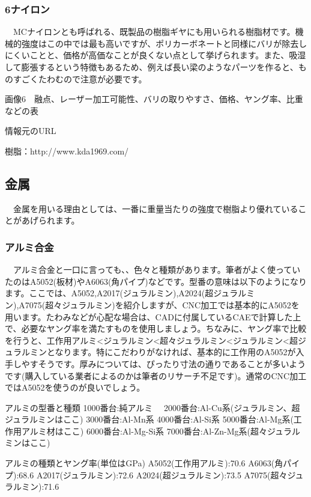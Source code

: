 \documentclass[onecolumn]{preport}
\begin{document}
\subsubsection{6ナイロン}

　MCナイロンとも呼ばれる、既製品の樹脂ギヤにも用いられる樹脂材です。機械的強度はこの中では最も高いですが、ポリカーボネートと同様にバリが除去しにくいことと、価格が高価なことが良くない点として挙げられます。また、吸湿して膨張するという特徴もあるため、例えば長い梁のようなパーツを作ると、ものすごくたわむので注意が必要です。

画像6　融点、レーザー加工可能性、バリの取りやすさ、価格、ヤング率、比重などの表

情報元のURL

樹脂：http://www.kda1969.com/

\subsection{金属}

　金属を用いる理由としては、一番に重量当たりの強度で樹脂より優れていることがあげられます。

\subsubsection{アルミ合金}

　アルミ合金と一口に言っても、、色々と種類があります。筆者がよく使っていたのはA5052(板材)やA6063(角パイプ)などです。型番の意味は以下のようになります。ここでは、A5052,A2017(ジュラルミン),A2024(超ジュラルミン),A7075(超々ジュラルミン)を紹介しますが、CNC加工では基本的にA5052を用います。たわみなどが心配な場合は、CADに付属しているCAEで計算した上で、必要なヤング率を満たすものを使用しましょう。ちなみに、ヤング率で比較を行うと、工作用アルミ<ジュラルミン<超々ジュラルミン<ジュラルミン<超ジュラルミンとなります。特にこだわりがなければ、基本的に工作用のA5052が入手しやすそうです。厚みについては、ぴったり寸法の通りであることが多いようです(購入している業者によるのかは筆者のリサーチ不足です)。通常のCNC加工ではA5052を使うのが良いでしょう。

アルミの型番と種類
1000番台:純アルミ　
2000番台:Al-Cu系(ジュラルミン、超ジュラルミンはここ)
3000番台:Al-Mn系
4000番台:Al-Si系
5000番台:Al-Mg系(工作用アルミ材はここ)
6000番台:Al-Mg-Si系
7000番台:Al-Zn-Mg系(超々ジュラルミンはここ)

アルミの種類とヤング率(単位はGPa)
A5052(工作用アルミ):70.6
A6063(角パイプ):68.6
A2017(ジュラルミン):72.6
A2024(超ジュラルミン):73.5
A7075(超々ジュラルミン):71.6
\end{document}
